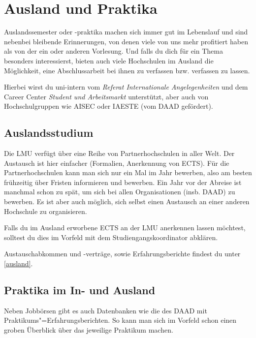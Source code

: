 ﻿\chapter{Ausland und Praktika}

Auslandssemester oder -praktika machen sich immer gut im Lebenslauf
und sind nebenbei bleibende Erinnerungen, von denen viele von uns mehr
profitiert haben als von der ein oder anderen Vorlesung. Und falls du
dich für ein Thema besonders interessierst, bieten auch viele
Hochschulen im Ausland die Möglichkeit, eine Abschlussarbeit bei ihnen
zu verfassen bzw. verfassen zu lassen.

Hierbei wirst du uni-intern vom \emph{Referat Internationale Angelegenheiten} und dem Career Center \emph{Student und Arbeitsmarkt} unterstützt, aber auch von Hochschulgruppen wie AISEC oder IAESTE (vom DAAD gefördert).

\section{Auslandsstudium}

Die LMU verfügt über eine Reihe von Partnerhochschulen in aller
Welt. Der Austausch ist hier einfacher (Formalien, Anerkennung von
ECTS). Für die
Partnerhochschulen kann man sich nur ein Mal im Jahr bewerben, also am
besten frühzeitig über Fristen informieren und bewerben.
Ein Jahr vor der Abreise ist manchmal schon zu spät, um sich bei
allen Organisationen (insb. DAAD) zu bewerben.
Es ist aber auch möglich, sich selbst einen Austausch an einer anderen
Hochschule zu organisieren.

Falls du im Ausland erworbene ECTS an der LMU anerkennen lassen
möchtest, solltest du dies im Vorfeld mit dem Studiengangskoordinator
abklären.

Austauschabkommen und -verträge, sowie Erfahrungsberichte findest du unter \ref{ausland}.

\begin{urlList}
\end{urlList}

\section{Praktika im In- und Ausland}

Neben Jobbörsen gibt es auch Datenbanken wie die des DAAD mit
Praktikums"=Erfahrungsberichten. So kann man sich im Vorfeld schon
einen groben Überblick über das jeweilige Praktikum machen.

